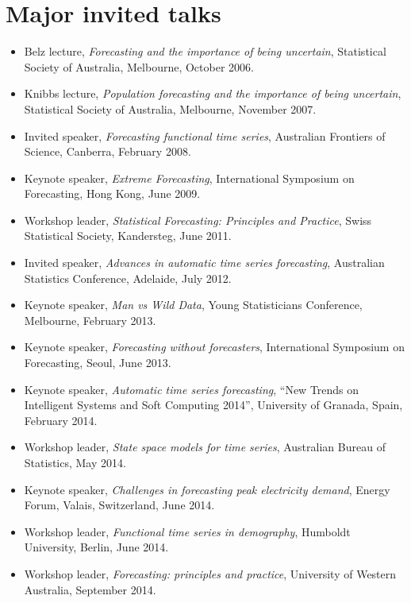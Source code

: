 \documentclass[10pt,a4paper,]{article}
\providecommand{\tightlist}{%
  \setlength{\itemsep}{0pt}\setlength{\parskip}{0pt}}
\begin{document}
\newpage

\hypertarget{major-invited-talks}{%
\section{Major invited talks}\label{major-invited-talks}}

\begin{itemize}
\tightlist
\item
  Belz lecture, \emph{Forecasting and the importance of being
  uncertain}, Statistical Society of Australia, Melbourne, October 2006.
\item
  Knibbs lecture, \emph{Population forecasting and the importance of
  being uncertain}, Statistical Society of Australia, Melbourne,
  November 2007.
\item
  Invited speaker, \emph{Forecasting functional time series}, Australian
  Frontiers of Science, Canberra, February 2008.
\item
  Keynote speaker, \emph{Extreme Forecasting}, International Symposium
  on Forecasting, Hong Kong, June 2009.
\item
  Workshop leader, \emph{Statistical Forecasting: Principles and
  Practice}, Swiss Statistical Society, Kandersteg, June 2011.
\item
  Invited speaker, \emph{Advances in automatic time series forecasting},
  Australian Statistics Conference, Adelaide, July 2012.
\item
  Keynote speaker, \emph{Man vs Wild Data}, Young Statisticians
  Conference, Melbourne, February 2013.
\item
  Keynote speaker, \emph{Forecasting without forecasters}, International
  Symposium on Forecasting, Seoul, June 2013.
\item
  Keynote speaker, \emph{Automatic time series forecasting}, ``New
  Trends on Intelligent Systems and Soft Computing 2014'', University of
  Granada, Spain, February 2014.
\item
  Workshop leader, \emph{State space models for time series}, Australian
  Bureau of Statistics, May 2014.
\item
  Keynote speaker, \emph{Challenges in forecasting peak electricity
  demand}, Energy Forum, Valais, Switzerland, June 2014.
\item
  Workshop leader, \emph{Functional time series in demography}, Humboldt
  University, Berlin, June 2014.
\item
  Workshop leader, \emph{Forecasting: principles and practice},
  University of Western Australia, September 2014.

\end{itemize}
\end{document}
